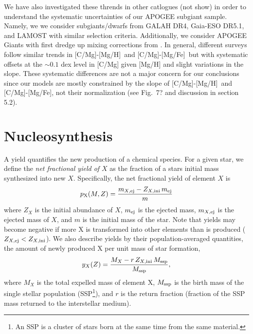 \documentclass[fleqn,
usenatbib]{mnras}
\newcommand{\caah}{[C/Mg]-[Mg/H]}
\newcommand{\caafe}{[C/Mg]-[Mg/Fe]}
\newcommand{\y}{p}
\newcommand{\dbadd}[1]{{\color{Thistle} #1}}
\begin{document}

We have also investigated these thrends in other catlogues (not show) in order to understand the systematic uncertainties of our APOGEE subgiant sample.
Namely, we we consider subgiants/dwarfs from GALAH DR4, Gaia-ESO DR5.1, and LAMOST with similar selection criteria. Additionally, we consider APOGEE Giants with first dredge up mixing corrections from \citep{vincenzo+21}.
In general, different surveys follow similar trends in \caah\ and \caafe\ but with systematic offsets at the $\sim{0.1}$ dex level in [C/Mg] given [Mg/H] and slight variations in the slope.
These systematic differences are not a major concern for our conclusions since our models are mostly constrained by the slope of \caah\ and \caafe,  not their normalization (see Fig.~7? and discussion in section \dbadd{5.2}).

\section{Nucleosynthesis}\label{sec:nucleosynthesis}

A yield quantifies the new production of a chemical species. For a given star, we define the {\it net fractional yield of $X$} as the fraction of a stars initial mass synthesized into new $X$. Specifically, the net fractional yield of element $X$ is
\begin{equation} 
   \y_{\rm X}(M, Z) = 
    \frac{m_{X, \rm ej}- Z_{X,\rm  ini}\,m_{\rm ej}}{m}
\end{equation}
where $Z_X$ is the initial abundance of $X$, $m_{\rm ej}$ is the ejected mass, $m_{X, \rm ej}$ is the ejected mass of $X$, and $m$ is the initial mass of the star.
Note that yields may become negative if more X is transformed into other elements than is produced ($Z_{X,\rm ej} < Z_{X,\rm ini}$).
We also describe yields by their population-averaged quantities, the amount of newly produced X per unit mass of star formation, 
\begin{equation} 
   y_{X}(Z) = 
    \frac{M_X - r\,Z_{X, \rm ini}\,M_{\rm ssp}}{M_{\rm ssp}},
\end{equation}
where $M_X$ is the total expelled mass of element X, $M_{\rm ssp}$ is the birth mass of the single stellar population (SSP\footnote{An SSP is a cluster of stars born at the same time from the same material.}), and $r$ is the return fraction (fraction of the SSP mass returned to the interstellar medium). 
\end{document}
